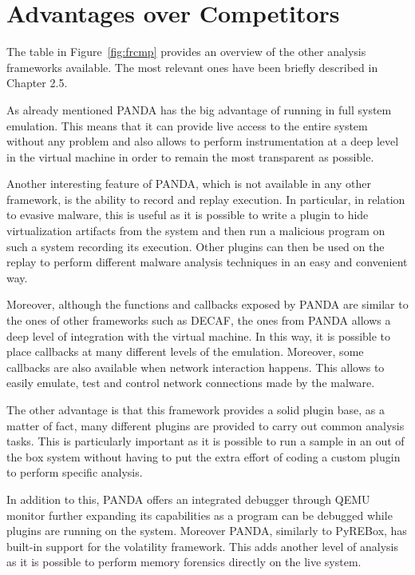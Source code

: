 \section{Advantages over Competitors}

The table in Figure~\ref{fig:frcmp} provides an overview of the other analysis frameworks available. The most relevant ones have been briefly described in Chapter 2.5. 

As already mentioned PANDA has the big advantage of running in full system emulation. This means that it can provide live access to the entire system without any problem and also allows to perform instrumentation at a deep level in the virtual machine in order to remain the most transparent as possible. 

Another interesting feature of PANDA, which is not available in any other framework, is the ability to record and replay execution. In particular, in relation to evasive malware, this is useful as it is possible to write a plugin to hide virtualization artifacts from the system and then run a malicious program on such a system recording its execution. Other plugins can then be used on the replay to perform different malware analysis techniques in an easy and convenient way.

Moreover, although the functions and callbacks exposed by PANDA are similar to the ones of other frameworks such as DECAF, the ones from PANDA allows a deep level of integration with the virtual machine. In this way, it is possible to place callbacks at many different levels of the emulation. Moreover, some callbacks are also available when network interaction happens. This allows to easily emulate, test and control network connections made by the malware. 

The other advantage is that this framework provides a solid plugin base, as a matter of fact, many different plugins are provided to carry out common analysis tasks. This is particularly important as it is possible to run a sample in an out of the box system without having to put the extra effort of coding a custom plugin to perform specific analysis. 

In addition to this, PANDA offers an integrated debugger through QEMU monitor further expanding its capabilities as a program can be debugged while plugins are running on the system. Moreover PANDA, similarly to PyREBox, has built-in support for the volatility framework. This adds another level of analysis as it is possible to perform memory forensics directly on the live system.